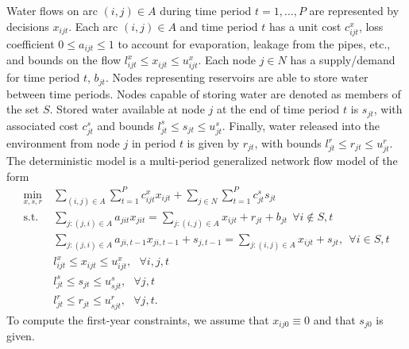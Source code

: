 \documentclass[opre,nonblindrev]{informs3} %
\newcommand{\st}{\mbox{s.t.}}
\begin{document}
Water flows on arc $(i,j) \in A$ during time period $t = 1, \dots, P$ are represented by decisions $x_{ijt}$.
Each arc $(i,j) \in A$ and time period $t$ has a unit cost $c_{ijt}^x$, loss coefficient $0 \leq a_{ijt} \leq 1$ to account for evaporation, leakage from the pipes, etc., and bounds on the flow $l_{ijt}^x \leq x_{ijt} \leq u_{ijt}^x$.
Each node $j \in N$ has a supply/demand for time period $t$, $b_{jt}$.
Nodes representing reservoirs are able to store water between time periods.
Nodes capable of storing water are denoted as members of the set $S$.
Stored water available at node $j$ at the end of time period $t$ is $s_{jt}$, with associated cost $c_{jt}^s$ and bounds $l_{jt}^s \leq s_{jt} \leq u_{jt}^s$.
Finally, water released into the environment from node $j$ in period $t$ is given by $r_{jt}$, with bounds $l_{jt}^r \leq r_{jt} \leq u_{jt}^r$.
The deterministic model is a multi-period generalized network flow model of the form
\begin{align*}
	\min_{x,s,r} \ & \sum_{(i,j) \in A} \sum_{t=1}^P c_{ijt}^x x_{ijt} + \sum_{j \in N} \sum_{t=1}^P c_{jt}^s s_{jt} \\
	\st \ & \sum_{j : (j,i) \in A} a_{jit} x_{jit} = \sum_{j : (i,j) \in A} x_{ijt} + r_{jt} + b_{jt} \ \ \forall i \not\in S, t \\
	& \sum_{j : (j,i) \in A} a_{ji,t-1} x_{ji,t-1} + s_{j,t-1} = \sum_{j : (i,j) \in A} x_{ijt} + s_{jt}, \ \ \forall i \in S,t \\
	& l_{ijt}^x \leq x_{ijt} \leq u_{ijt}^x,\ \ \ \forall i,j,t \\
	& l_{jt}^s \leq s_{jt} \leq u_{sjt}^s, \ \ \ \forall j,t \\
	& l_{jt}^r \leq r_{jt} \leq u_{sjt}^r, \ \ \ \forall j,t.
\end{align*}
To compute the first-year constraints, we assume that $x_{ij0} \equiv 0$ and that $s_{j0}$ is given.
\end{document}
